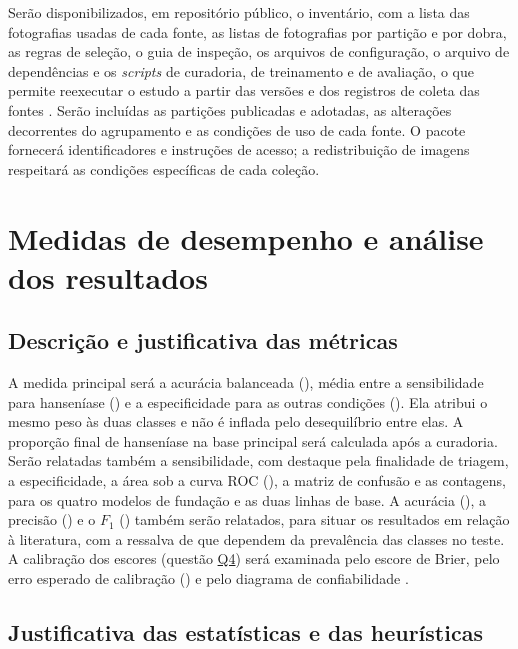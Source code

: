 Serão disponibilizados, em repositório público, o inventário, com a lista
das fotografias usadas de cada fonte, as listas de fotografias por partição e
por dobra, as regras de seleção, o guia de
inspeção, os arquivos de configuração, o arquivo de dependências e os
\textit{scripts} de curadoria, de treinamento e de avaliação, o que permite
reexecutar o estudo a partir das versões e dos registros de coleta das fontes
\cite{acmSigsoftDataScience,wohlin2024}. Serão incluídas as partições
publicadas e adotadas, as alterações decorrentes do agrupamento e as
condições de uso de cada fonte. O pacote fornecerá identificadores e
instruções de acesso; a redistribuição de imagens respeitará as condições
específicas de cada coleção.

\section{Medidas de desempenho e análise dos resultados}
\label{sec:medidas-avaliacao-empirica}

\subsection{Descrição e justificativa das métricas}
\label{subsec:descricao-metricas}

A medida principal será a acurácia balanceada (), média entre
a sensibilidade para hanseníase () e a especificidade para as
outras condições (). Ela atribui o mesmo peso às duas classes
e não é inflada pelo desequilíbrio entre elas. A proporção final de
hanseníase na base principal será calculada após a curadoria. Serão relatadas também a
sensibilidade, com destaque pela finalidade de triagem, a especificidade,
a área sob a curva ROC (), a matriz de confusão e as
contagens, para os quatro modelos de fundação e as duas linhas de base. A
acurácia (), a precisão () e o $F_1$ ()
também serão relatados, para situar os resultados em relação à literatura,
com a ressalva de que dependem da prevalência das classes no teste. A
calibração dos escores (questão \hyperlink{questao-q4}{Q4}) será examinada pelo escore de Brier, pelo
erro esperado de calibração () e pelo diagrama de
confiabilidade \cite{guo2017calibration}.

\subsection{Justificativa das estatísticas e das heurísticas}
\label{subsec:justificativa-estatisticas}
\label{subsec:alem-valores-unicos}

